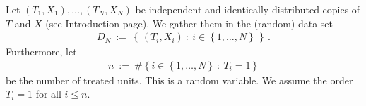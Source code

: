 Let $(T_1,X_1),\ldots,(T_N,X_N)$ be independent and identically-distributed copies of $T$ and $X$ (see Introduction page). 
We gather them in the (random) data set 
\begin{gather*}
D_N
\ 
:=
\ 
\left\{\, (T_i,X_i)\ \colon\  i\in \left\{ 1,\ldots,N \right\}\, \right\}
\,.
\end{gather*}
Furthermore, let 
\begin{gather*}
  n
  \ 
  :=
  \ 
  \# 
  \left\{ 
    i\in \left\{ 1,\ldots,N \right\}
    \ 
    \colon
    \ 
    T_i=1
  \right\}
\end{gather*}
be the number of treated units. This is a random variable. We assume the order $T_i=1$ for all $i\le n$.
